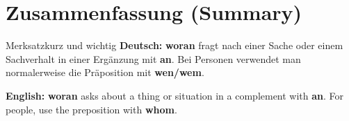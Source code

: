 \documentclass[a4paper,11pt]{article}
\newcommand{\GermanText}[1]{\textbf{Deutsch: }#1\par}
\newcommand{\EnglishText}[1]{{\small\color{SoftGray}\textbf{English: }#1\par}}
\begin{document}
\section{Zusammenfassung (Summary)}
\begin{grammarentry}{Merksatz}{kurz und wichtig}
\GermanText{\textbf{woran} fragt nach einer Sache oder einem Sachverhalt in einer Ergänzung mit \textbf{an}. Bei Personen verwendet man normalerweise die Präposition mit \textbf{wen/wem}.}
\EnglishText{\textbf{woran} asks about a thing or situation in a complement with \textbf{an}. For people, use the preposition with \textbf{whom}.}
\end{grammarentry}
\end{document}

